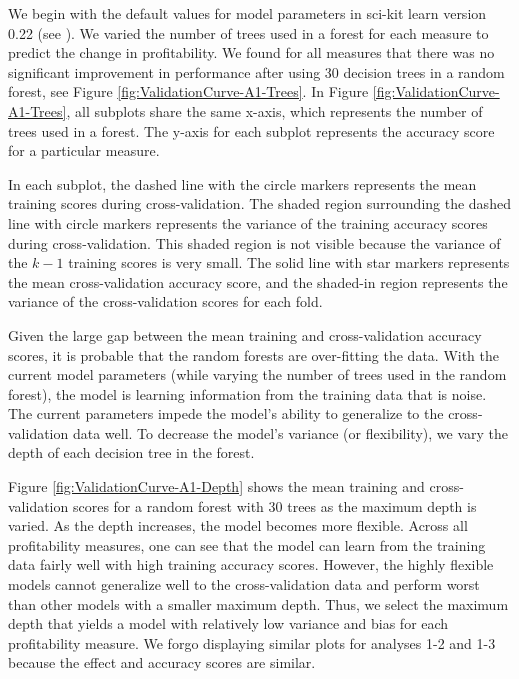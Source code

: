 We begin with the default values for model parameters in sci-kit learn version 0.22 (see \cite{scikit-learn}). We varied the number of trees used in a forest for each measure to predict the change in profitability. We found for all measures that there was no significant improvement in performance after using 30 decision trees in a random forest, see Figure \ref{fig:ValidationCurve-A1-Trees}. In Figure \ref{fig:ValidationCurve-A1-Trees}, all subplots share the same x-axis, which represents the number of trees used in a forest. The y-axis for each subplot represents the accuracy score for a particular measure.

In each subplot, the dashed line with the circle markers represents the mean training scores during cross-validation. The shaded region surrounding the dashed line with circle markers represents the variance of the training accuracy scores during cross-validation.  This shaded region is not visible because the variance of the \(k-1\) training scores is very small. The solid line with star markers represents the mean cross-validation accuracy score, and the shaded-in region represents the variance of the cross-validation scores for each fold.

Given the large gap between the mean training and cross-validation accuracy scores, it is probable that the random forests are over-fitting the data. With the current model parameters (while varying the number of trees used in the random forest), the model is learning information from the training data that is noise. The current parameters impede the model's ability to generalize to the cross-validation data well. To decrease the model's variance (or flexibility), we vary the depth of each decision tree in the forest. 

Figure \ref{fig:ValidationCurve-A1-Depth} shows the mean training and cross-validation scores for a random forest with 30 trees as the maximum depth is varied.  As the depth increases, the model becomes more flexible. Across all profitability measures, one can see that the model can learn from the training data fairly well with high training accuracy scores. However, the highly flexible models cannot generalize well to the cross-validation data and perform worst than other models with a smaller maximum depth. Thus, we select the maximum depth that yields a model with relatively low variance and bias for each profitability measure. We forgo displaying similar plots for analyses 1-2 and 1-3 because the effect and accuracy scores are similar. 


